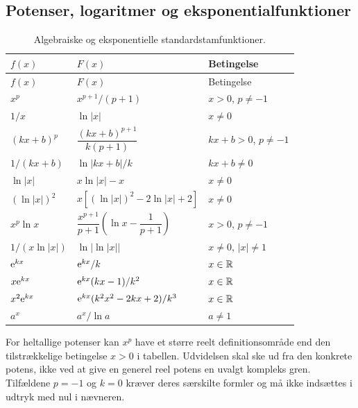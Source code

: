 \subsection{Potenser, logaritmer og eksponentialfunktioner}
\begin{longtable}{@{}p{}p{}p{}@{}}
\caption{Algebraiske og eksponentielle standardstamfunktioner.}\\
\toprule $f(x)$ & $F(x)$ & Betingelse\\\midrule\endfirsthead
\toprule $f(x)$ & $F(x)$ & Betingelse\\\midrule\endhead
$x^p$ & $x^{p+1}/(p+1)$ & $x>0$, $p\ne-1$\\[2mm]
$1/x$ & $\ln|x|$ & $x\ne0$\\[2mm]
$(kx+b)^p$ & $\dfrac{(kx+b)^{p+1}}{k(p+1)}$ & $kx+b>0$, $p\ne-1$\\[3mm]
$1/(kx+b)$ & $\ln|kx+b|/k$ & $kx+b\ne0$\\[2mm]
$\ln|x|$ & $x\ln|x|-x$ & $x\ne0$\\[2mm]
$(\ln|x|)^2$ & $x[(\ln|x|)^2-2\ln|x|+2]$ & $x\ne0$\\[2mm]
$x^p\ln x$ & $\dfrac{x^{p+1}}{p+1}\left(\ln x-\dfrac1{p+1}\right)$ & $x>0$, $p\ne-1$\\[3mm]
$1/(x\ln|x|)$ & $\ln\bigl|\ln|x|\bigr|$ & $x\ne0$, $|x|\ne1$\\[2mm]
$\mathrm{e}^{kx}$ & $\mathrm{e}^{kx}/k$ & $x\in\mathbb{R}$\\[2mm]
$x\mathrm{e}^{kx}$ & $\mathrm{e}^{kx}(kx-1)/k^2$ & $x\in\mathbb{R}$\\[2mm]
$x^2\mathrm{e}^{kx}$ & $\mathrm{e}^{kx}(k^2x^2-2kx+2)/k^3$ & $x\in\mathbb{R}$\\[2mm]
$a^x$ & $a^x/\ln a$ & $a\ne1$\\
\bottomrule
\end{longtable}
For heltallige potenser kan $x^p$ have et større reelt definitionsområde
end den tilstrækkelige betingelse $x>0$ i tabellen. Udvidelsen skal ske ud
fra den konkrete potens, ikke ved at give en generel reel potens en
uvalgt kompleks gren. Tilfældene $p=-1$ og $k=0$ kræver deres særskilte
formler og må ikke indsættes i udtryk med nul i nævneren.

